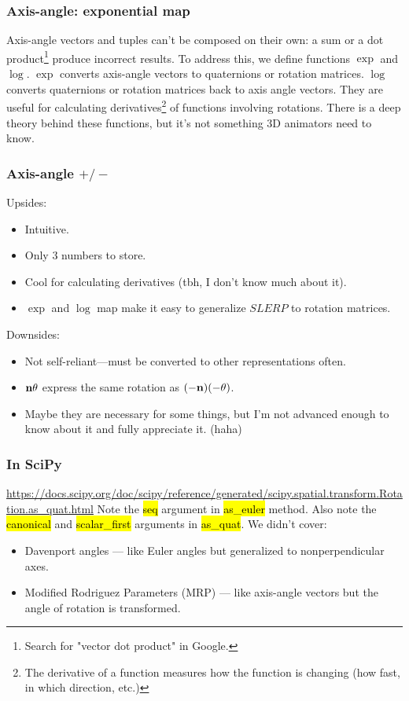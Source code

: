 \documentclass{beamer}
\begin{document}
\begin{frame}
\frametitle{Axis-angle: exponential map}
Axis-angle vectors and tuples can't be composed on their own: a sum or a dot product\footnote{Search for "vector dot product" in Google.} produce incorrect results.
To address this, we define functions $\exp$ and $\log$.
\vfill
$\exp$ converts axis-angle vectors to quaternions or rotation matrices.
$\log$ converts quaternions or rotation matrices back to axis angle vectors.
\vfill
They are useful for calculating derivatives\footnote{The derivative of a function measures how the function is changing (how fast, in which direction, etc.)} of functions involving rotations. There is a deep theory behind these functions, but it's not something 3D animators need to know.
\end{frame}
    
\begin{frame}
\frametitle{Axis-angle $+/-$}
Upsides:
\begin{itemize}
	\item Intuitive.
	\item Only 3 numbers to store.
	\item Cool for calculating derivatives (tbh, I don't know much about it). 
	\item $\exp$ and $\log$ map make it easy to generalize $SLERP$ to rotation matrices. 
\end{itemize}
Downsides:
\begin{itemize}
	\item Not self-reliant---must be converted to other representations often.
	\item $\mathbf{n} \theta$ express the same rotation as $(-\mathbf{n})(-\theta)$.
	\item Maybe they are necessary for some things, but I'm not advanced enough to know about it and fully appreciate it. (haha)
\end{itemize}
\end{frame}

\begin{frame}
\frametitle{In SciPy}
\url{https://docs.scipy.org/doc/scipy/reference/generated/scipy.spatial.transform.Rotation.as_quat.html}
\vfill
Note the \hl{seq} argument in \hl{as\_euler} method. Also note the \hl{canonical} and \hl{scalar\_first} arguments in \hl{as\_quat}.
\vfill
We didn't cover: 
\begin{itemize}
	\item Davenport angles --- like Euler angles but generalized to nonperpendicular axes.  
	\item Modified Rodriguez Parameters (MRP) --- like axis-angle vectors but the angle of rotation is transformed.
\end{itemize}
\end{frame}
\end{document}
